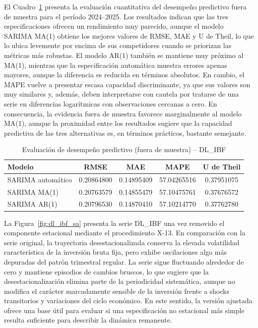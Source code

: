 \documentclass[11pt]{article}
\begin{document}
El Cuadro~\ref{tab:forecast_ibf} presenta la evaluación cuantitativa del desempeño predictivo fuera de muestra para el período 2024--2025. Los resultados indican que las tres especificaciones ofrecen un rendimiento muy parecido, aunque el modelo SARIMA MA(1) obtiene los mejores valores de RMSE, MAE y U de Theil, lo que lo ubica levemente por encima de sus competidores cuando se priorizan las métricas más robustas. El modelo AR(1) también se mantiene muy próximo al MA(1), mientras que la especificación automática muestra errores apenas mayores, aunque la diferencia es reducida en términos absolutos. En cambio, el MAPE vuelve a presentar escasa capacidad discriminante, ya que sus valores son muy similares y, además, deben interpretarse con cautela por tratarse de una serie en diferencias logarítmicas con observaciones cercanas a cero. En consecuencia, la evidencia fuera de muestra favorece marginalmente al modelo MA(1), aunque la proximidad entre los resultados sugiere que la capacidad predictiva de las tres alternativas es, en términos prácticos, bastante semejante.

\begin{table}[H]
\centering
\caption{Evaluación de desempeño predictivo (fuera de muestra) – DL\_IBF}
\label{tab:forecast_ibf}
\begin{tabular}{lcccc}
\hline
Modelo & RMSE & MAE & MAPE & U de Theil \\
\hline
SARIMA automático & 0.20864800 & 0.14895409 & 57.04265516 & 0.37951075 \\
SARIMA MA(1)      & 0.20763579 & 0.14855479 & 57.10475761 & 0.37676572 \\
SARIMA AR(1)      & 0.20796530 & 0.14870410 & 57.10214770 & 0.37762780 \\
\hline
\end{tabular}
\end{table}

La Figura~\ref{fig:dl_ibf_sa} presenta la serie DL\_IBF una vez removido el componente estacional mediante el procedimiento X-13. En comparación con la serie original, la trayectoria desestacionalizada conserva la elevada volatilidad característica de la inversión bruta fija, pero exhibe oscilaciones algo más depuradas del patrón trimestral regular. La serie sigue fluctuando alrededor de cero y mantiene episodios de cambios bruscos, lo que sugiere que la desestacionalización elimina parte de la periodicidad sistemática, aunque no modifica el carácter marcadamente sensible de la inversión frente a shocks transitorios y variaciones del ciclo económico. En este sentido, la versión ajustada ofrece una base útil para evaluar si una especificación no estacional más simple resulta suficiente para describir la dinámica remanente.
\end{document}
